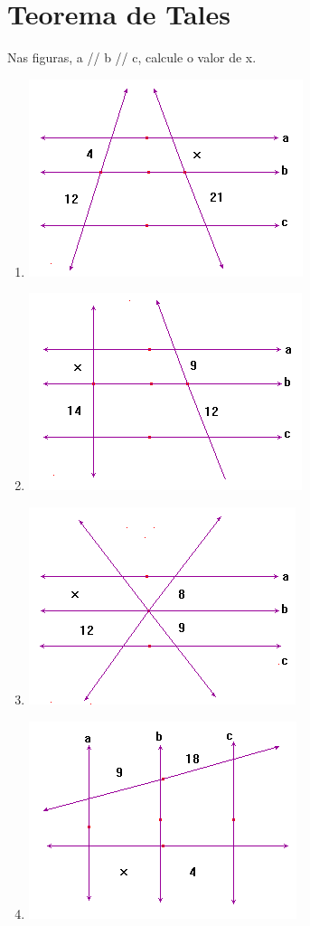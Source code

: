 \chapter{Teorema de Tales}

	\item Nas figuras, a // b // c, calcule o valor de x.
		\begin{multicols}{2}
		\begin{enumerate}
			\item \includegraphics[scale=0.7]{figuras/fig46.png}
			\item \includegraphics[scale=0.7]{figuras/fig47.png}
			\item \includegraphics[scale=0.7]{figuras/fig48.png}
			\item \includegraphics[scale=0.7]{figuras/fig49.png}

\end{enumerate}
\end{multicols}

